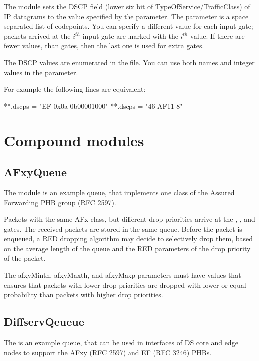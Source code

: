 The  module sets the DSCP field
(lower six bit of TypeOfService/TrafficClass) of IP datagrams
to the value specified by the  parameter.
The  parameter is a space separated list
of codepoints. You can specify a different value
for each input gate; packets arrived at the $i^{th}$
input gate are marked with the $i^{th}$ value.
If there are fewer values, than gates, then the last
one is used for extra gates.

The DSCP values are enumerated in the  file.
You can use both names and integer values in the 
parameter.

For example the following lines are equivalent:
\begin{inifile}
**.dscps = "EF 0x0a 0b00001000"
**.dscps = "46 AF11 8"
\end{inifile}

\section{Compound modules}

\subsection{AFxyQueue}

The  module is an example queue, that implements
one class of the Assured Forwarding PHB group (RFC 2597).

Packets with the same AFx class, but different drop priorities
arrive at the , , and  gates.
The received packets are stored in the same queue. Before the packet
is enqueued, a RED dropping algorithm may decide to selectively
drop them, based on the average length of the queue and the RED parameters
of the drop priority of the packet.

The afxyMinth, afxyMaxth, and afxyMaxp parameters must have values that
ensures that packets with lower drop priorities are dropped with lower
or equal probability than packets with higher drop priorities.

\subsection{DiffservQeueue}

The  is an example queue, that can be used in
interfaces of DS core and edge nodes to support
the AFxy (RFC 2597) and EF (RFC 3246) PHBs.

